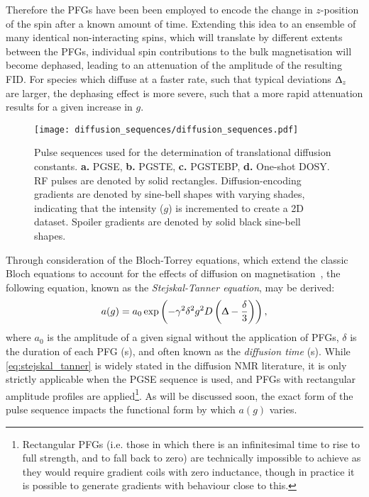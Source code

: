Therefore the \acp{PFG} have been been employed to encode the
change in $z$-position of the spin after a known amount of time.
Extending this idea to an ensemble of many identical non-interacting spins,
which will translate by different extents between the \acp{PFG}, individual
spin contributions to the bulk magnetisation will become dephased, leading to
an attenuation of the amplitude of the resulting \ac{FID}. For species which
diffuse at a faster rate, such that typical deviations $\Updelta_z$ are
larger, the dephasing effect is more severe, such that a more rapid attenuation
results for a given increase in $g$.

\begin{figure}
   \texttt{[image: diffusion\_sequences/diffusion\_sequences.pdf]}
   \caption[
       Pulse sequences used for the determination of translational diffusion constants.
   ]{
       Pulse sequences used for the determination of translational diffusion constants.
       \textbf{a.} \acs{PGSE},
       \textbf{b.} \acs{PGSTE},
       \textbf{c.} \acs{PGSTEBP},
       \textbf{d.} One-shot DOSY.
       \ac{RF} pulses are denoted by solid rectangles. Diffusion-encoding
       gradients are denoted by sine-bell shapes with varying shades,
       indicating that the intensity ($g$) is incremented to create a \ac{2D}
       dataset. Spoiler gradients are denoted by solid black sine-bell shapes.
   }
   \label{fig:diffusion_sequences}
\end{figure}

Through consideration of the Bloch-Torrey equations, which
extend the classic Bloch equations to account for the effects of diffusion on
magnetisation~\cite{Torrey1956}, the following equation, known as the
\emph{Stejskal-Tanner equation}, may be derived:
\begin{equation}
    a(g) = a_0 \exp \left(- \gamma^2 \delta^2 g^2 D \left(\Updelta -
    \frac{\delta}{3}\right)\right),
    \label{eq:stejskal_tanner}
\end{equation}
where
$a_0$ is the amplitude of a given signal without the application of \acp{PFG},
$\delta$ is the duration of each \ac{PFG} (\unit{\second}), and
\label{corr:diffusion-time} often known as the \emph{diffusion time}
(\unit{\second}).
While \cref{eq:stejskal_tanner} is widely stated in the diffusion \ac{NMR}
literature, it is only strictly applicable when the \ac{PGSE} sequence is used,
and \acp{PFG} with rectangular amplitude profiles are applied\footnote{
    Rectangular \acp{PFG} (i.e. those in which there is an infinitesimal time
    to rise to full strength, and to fall back to zero) are technically
    impossible to achieve as they would require gradient coils with zero
    inductance, though in practice it is possible to generate gradients with
    behaviour close to this.
}. As will be discussed soon, the exact form of the pulse sequence impacts the
functional form by which $a(g)$ varies.

